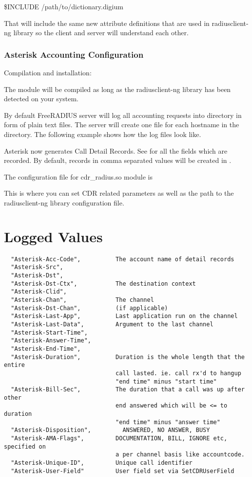 	\$INCLUDE /path/to/dictionary.digium

	That will include the same new attribute definitions that are used
	in radiusclient-ng library so the client and server will understand each
	other.


\subsubsection{Asterisk Accounting Configuration}

	Compilation and installation:

        The module will be compiled as long as the radiusclient-ng
        library has been detected on your system.
	
	By default FreeRADIUS server will log all accounting requests into
	 directory in form of plain text files.
	The server will create one file for each hostname in the directory. The
	following example shows how the log files look like.

	Asterisk now generates Call Detail Records. See 
	for all the fields which are recorded. By default, records in comma
	separated values will be created in .

	The configuration file for cdr\_radius.so module is 
	
	This is where you can set CDR related parameters as well as the path to
	the radiusclient-ng library configuration file.


\section{Logged Values}
\begin{verbatim}
  "Asterisk-Acc-Code",          The account name of detail records
  "Asterisk-Src",
  "Asterisk-Dst",
  "Asterisk-Dst-Ctx",           The destination context
  "Asterisk-Clid",
  "Asterisk-Chan",              The channel
  "Asterisk-Dst-Chan",	        (if applicable)
  "Asterisk-Last-App",	        Last application run on the channel
  "Asterisk-Last-Data",         Argument to the last channel
  "Asterisk-Start-Time",
  "Asterisk-Answer-Time",
  "Asterisk-End-Time",
  "Asterisk-Duration",          Duration is the whole length that the entire
                                call lasted. ie. call rx'd to hangup
                                "end time" minus "start time"
  "Asterisk-Bill-Sec", 	        The duration that a call was up after other
                                end answered which will be <= to duration
                                "end time" minus "answer time"
  "Asterisk-Disposition",    	  ANSWERED, NO ANSWER, BUSY
  "Asterisk-AMA-Flags",       	DOCUMENTATION, BILL, IGNORE etc, specified on
                                a per channel basis like accountcode.
  "Asterisk-Unique-ID",         Unique call identifier
  "Asterisk-User-Field"	        User field set via SetCDRUserField
\end{verbatim}
